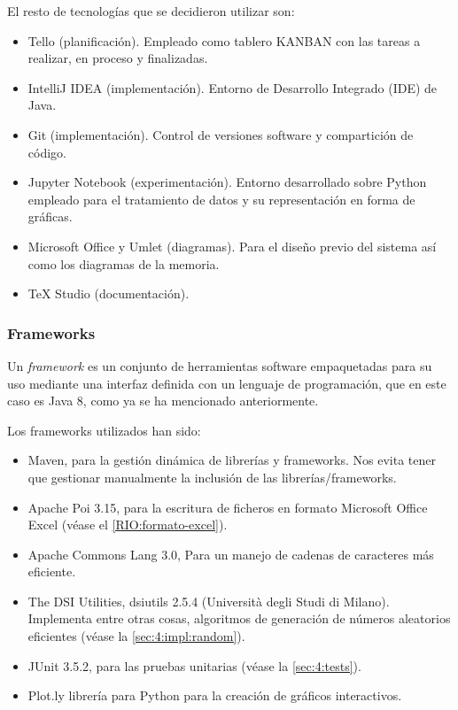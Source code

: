 El resto de tecnologías que se decidieron utilizar son:

\begin{itemize}
	\item Tello (planificación). Empleado como tablero KANBAN con las tareas a realizar, en proceso y finalizadas.
	\item IntelliJ IDEA (implementación). Entorno de Desarrollo Integrado (IDE) de Java.
	\item Git (implementación). Control de versiones software y compartición de código.
	\item Jupyter Notebook (experimentación). Entorno desarrollado sobre Python empleado para el tratamiento de datos y su representación en forma de gráficas.
	\item Microsoft Office y Umlet (diagramas). Para el diseño previo del sistema así como los diagramas de la memoria.
	\item \TeX{} Studio (documentación).
\end{itemize}

\subsubsection{Frameworks}
Un \textit{framework} es un conjunto de herramientas software empaquetadas para su uso mediante una interfaz definida con un lenguaje de programación, que en este caso es Java 8, como ya se ha mencionado anteriormente.

Los frameworks utilizados han sido:

\begin{itemize}
	\item Maven, para la gestión dinámica de librerías y frameworks. Nos evita tener que gestionar manualmente la inclusión de las librerías/frameworks.
	\item Apache Poi 3.15, para la escritura de ficheros en formato Microsoft Office Excel (véase el \ref{RIO:formato-excel}).
	\item Apache Commons Lang 3.0, Para un manejo de cadenas de caracteres más eficiente.
	\item The DSI Utilities, dsiutils 2.5.4 (Università degli Studi di Milano). Implementa entre otras cosas, algoritmos de generación de números aleatorios eficientes (véase la \autoref{sec:4:impl:random}).
	\item JUnit 3.5.2, para las pruebas unitarias (véase la \autoref{sec:4:tests}).
	\item Plot.ly librería para Python para la creación de gráficos interactivos.
\end{itemize}

